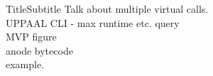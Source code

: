 

\begin{frame}{Title}{Subtitle}
Talk about multiple virtual calls. \\
UPPAAL CLI - max runtime etc. query \\
MVP figure \\
anode bytecode\\
example.
\end{frame}

